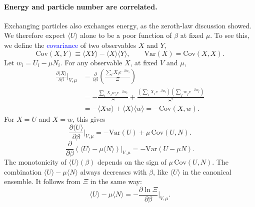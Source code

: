 \paragraph{Energy and particle number are correlated.}
Exchanging particles also exchanges energy, as the zeroth-law discussion
showed. We therefore expect $\langle U\rangle$ alone to be a poor function of
$\beta$ at fixed $\mu$. To see this, we define the
\textcolor{blue}{covariance} of two observables $X$ and $Y$,
\begin{equation}
    \boxed{\mathrm{Cov}(X,Y)\equiv\langle XY\rangle-\langle X\rangle\langle Y\rangle,
    \qquad\mathrm{Var}(X)=\mathrm{Cov}(X,X).}
\end{equation}
Let $w_i=U_i-\mu N_i$. For any observable $X$, at fixed $V$ and $\mu$,
\begin{align*}
    \frac{\partial\langle X\rangle}{\partial\beta}\bigg|_{V,\mu}
    &=\frac{\partial}{\partial\beta}\left(\frac{\sum_i X_i e^{-\beta w_i}}{\Xi}\right)\\
    &=-\frac{\sum_i X_i w_i e^{-\beta w_i}}{\Xi}
    +\frac{\left(\sum_i X_i e^{-\beta w_i}\right)\left(\sum_j w_j e^{-\beta w_j}\right)}{\Xi^2}\\
    &=-\langle Xw\rangle+\langle X\rangle\langle w\rangle
    =-\mathrm{Cov}(X,w).
\end{align*}
For $X=U$ and $X=w$, this gives
\begin{equation}
    \boxed{\frac{\partial\langle U\rangle}{\partial\beta}\bigg|_{V,\mu}
    =-\mathrm{Var}(U)+\mu\,\mathrm{Cov}(U,N).}
\end{equation}
\begin{equation}
    \boxed{\frac{\partial}{\partial\beta}\left(\langle U\rangle-\mu\langle N\rangle\right)\bigg|_{V,\mu}
    =-\mathrm{Var}(U-\mu N).}
\end{equation}
The monotonicity of $\langle U\rangle(\beta)$ depends on the sign of
$\mu\,\mathrm{Cov}(U,N)$. The combination $\langle U\rangle-\mu\langle N\rangle$
always decreases with $\beta$, like $\langle U\rangle$ in the canonical
ensemble. It follows from $\Xi$ in the same way:
\begin{equation}
    \boxed{\langle U\rangle-\mu\langle N\rangle
    =-\frac{\partial\ln\Xi}{\partial\beta}\bigg|_{V,\mu}.}
\end{equation}

